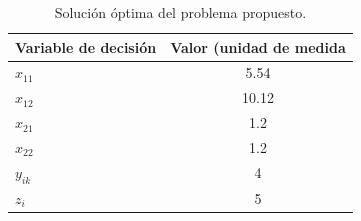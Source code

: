 \documentclass[11pt,addpoints]{article}
\begin{document}
\begin{table}[h]
\centering
\begin{tabular}{|l|c|}
\hline
\textbf{Variable de decisión}                                    & \multicolumn{1}{l|}{\textbf{Valor (unidad de medida}} \\ \hline
$x_{11}$              & 5.54                                     \\ \hline
$x_{12}$              & 10.12                                     \\ \hline
$x_{21}$              & 1.2                                     \\ \hline
$x_{22}$              & 1.2                                     \\ \hline
$y_{ik}$ & 4                                     \\ \hline
$z_i$                                   & 5                                     \\ \hline

\end{tabular}
\caption{Solución óptima del problema propuesto.}
\label{tab:my-table}
\end{table}
\end{document}
